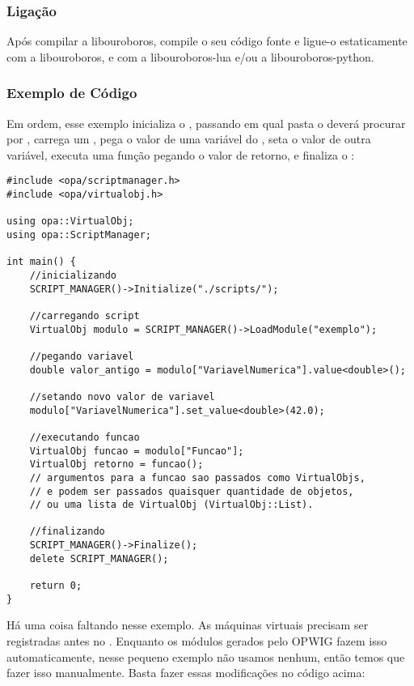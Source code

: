 \subsubsection{Ligação} 
Após compilar a libouroboros, compile o seu código fonte e ligue-o estaticamente
com a libouroboros, e com a libouroboros-lua e/ou a libouroboros-python.
    
\subsubsection{Exemplo de Código} 
Em ordem, esse exemplo inicializa o \SMgr{}, passando em qual pasta
o \SMgr{} deverá procurar por , carrega um \script{},
pega o valor de uma variável do \script{}, seta o valor de outra variável, 
executa uma função pegando o valor de retorno, e finaliza o \SMgr{}:
    
\begin{lstlisting}
#include <opa/scriptmanager.h>
#include <opa/virtualobj.h>

using opa::VirtualObj;
using opa::ScriptManager;

int main() {
    //inicializando
    SCRIPT_MANAGER()->Initialize("./scripts/");
    
    //carregando script
    VirtualObj modulo = SCRIPT_MANAGER()->LoadModule("exemplo");
    
    //pegando variavel
    double valor_antigo = modulo["VariavelNumerica"].value<double>();
    
    //setando novo valor de variavel
    modulo["VariavelNumerica"].set_value<double>(42.0);
    
    //executando funcao
    VirtualObj funcao = modulo["Funcao"];
    VirtualObj retorno = funcao(); 
    // argumentos para a funcao sao passados como VirtualObjs, 
    // e podem ser passados quaisquer quantidade de objetos,
    // ou uma lista de VirtualObj (VirtualObj::List).
    
    //finalizando
    SCRIPT_MANAGER()->Finalize();
    delete SCRIPT_MANAGER();
    
    return 0;
}
\end{lstlisting}

Há uma coisa faltando nesse exemplo. As máquinas virtuais precisam ser registradas antes no \SMgr{}.
Enquanto os módulos gerados pelo OPWIG fazem isso automaticamente, nesse pequeno exemplo não
usamos nenhum, então temos que fazer isso manualmente. Basta fazer essas modificações no código acima:

